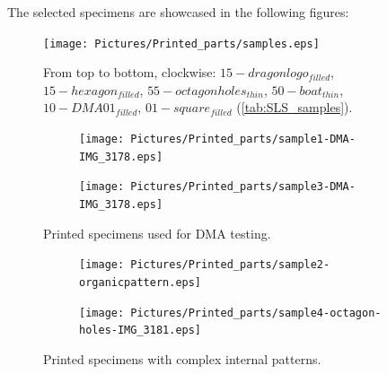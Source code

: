 \documentclass{article}
\begin{document}
        The selected specimens are showcased in the following figures: 

        \begin{figure}[h!]
            \centering
            \texttt{[image: Pictures/Printed\_parts/samples.eps]}
            \caption{From top to bottom, clockwise: $15-dragonlogo_{filled}$, $15-hexagon_{filled}$, $55-octagonholes_{thin}$, 
            $50-boat_{thin}$, $10-DMA01_{filled}$, $01-square_{filled}$ (\ref{tab:SLS_samples}).}
            \label{fig:printed_specimens}
        \end{figure}

        \begin{figure}[h!]
            \centering
            \begin{subfigure}[a]{0.55\textwidth}
                \texttt{[image: Pictures/Printed\_parts/sample1-DMA-IMG\_3178.eps]}
            \end{subfigure}
                \vfill
            
            \begin{subfigure}[b]{0.5\textwidth}
                \centering
                \texttt{[image: Pictures/Printed\_parts/sample3-DMA-IMG\_3178.eps]}
                \end{subfigure}
            \caption{Printed specimens used for DMA testing.}
            \label{fig:printed_specimens_DMA}
        \end{figure}

        \begin{figure}[h!]
            \centering 
            \begin{subfigure}[a]{0.41\textwidth}
                \texttt{[image: Pictures/Printed\_parts/sample2-organicpattern.eps]}
            \end{subfigure}
                \vfill
            \begin{subfigure}[b]{0.5\textwidth}
                \centering
                \texttt{[image: Pictures/Printed\_parts/sample4-octagon-holes-IMG\_3181.eps]}
            \end{subfigure}
            \caption{Printed specimens with complex internal patterns.}
            \label{fig:printed_specimens_complex}
        \end{figure}
\end{document}
